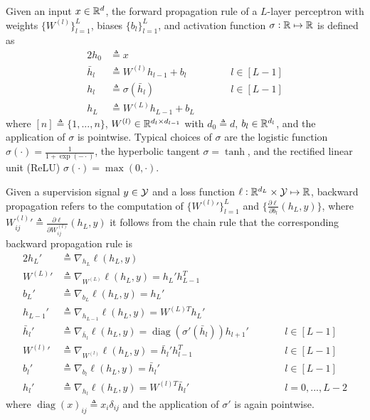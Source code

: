 \documentclass{article}
\DeclareMathOperator{\diag}{diag}
\newcommand{\pp}[2]{{\frac{\partial {#1}}{\partial {#2}}}}
\begin{document}
Given an input $x \in {\mathbb R}^d$, the forward propagation rule of a $L$-layer perceptron with weights $\{W^{(l)}\}_{l = 1}^L$, biases $\{b_l\}_{l = 1}^L$, and activation function $\sigma: {\mathbb R} \mapsto {\mathbb R}$ is defined as
\begin{alignat*}{2}
h_0 & \triangleq x \\
\bar{h}_l & \triangleq W^{(l)} h_{l - 1} + b_l && \qquad l \in [L - 1] \\
h_l & \triangleq \sigma (\bar{h}_l) && \qquad l \in [L - 1] \\
h_L & \triangleq W^{(L)} h_{L - 1} + b_L
\end{alignat*}
where $[n] \triangleq \{1, ..., n\}$, $W^{(l)} \in {\mathbb R}^{d_l \times d_{l - 1}}$ with $d_0 \triangleq d$, $b_l \in {\mathbb R}^{d_l}$, and the application of $\sigma$ is pointwise.
Typical choices of $\sigma$ are the logistic function $\sigma (\cdot) = \frac1{1 + \exp (-\cdot)}$, the hyperbolic tangent $\sigma = \tanh$, and the rectified linear unit (ReLU) $\sigma (\cdot) = \max (0, \cdot)$.

Given a supervision signal $y \in {\mathcal Y}$ and a loss function $\ell: {\mathbb R}^{d_L} \times {\mathcal Y} \mapsto {\mathbb R}$, backward propagation refers to the computation of $\{W^{(l)}'\}_{l = 1}^L$ and $\{\pp{\ell}{b_l} (h_L, y)\}$, where $W_{i j}^{(l)}' \triangleq \pp{\ell}{W_{i j}^{(l)}} (h_L, y)$
it follows from the chain rule that the corresponding backward propagation rule is
\begin{alignat*}{2}
h_L' & \triangleq \nabla_{h_L} \ell (h_L, y) \\
W^{(L)}' & \triangleq \nabla_{W^{(L)}} \ell (h_L, y) = h_L' h_{L - 1}^T \\
b_L' & \triangleq \nabla_{b_L} \ell (h_L, y) = h_L' \\
h_{L - 1}' & \triangleq \nabla_{h_{L - 1}} \ell (h_L, y) = W^{(L) T} h_L' \\
\bar{h}_l' & \triangleq \nabla_{\bar{h}_l} \ell (h_L, y) = \diag (\sigma' (\bar{h}_l)) h_{l + 1}' && \qquad l \in [L - 1] \\
W^{(l)}' & \triangleq \nabla_{W^{(l)}} \ell (h_L, y) = \bar{h}_l' h_{l - 1}^T && \qquad l \in [L - 1] \\
b_l' & \triangleq \nabla_{b_l} \ell (h_L, y) = \bar{h}_l' && \qquad l \in [L - 1] \\
h_l' & \triangleq \nabla_{h_l} \ell (h_L, y) = W^{(l) T} \bar{h}_l' && \qquad l = 0, ..., L - 2
\end{alignat*}
where $\diag (x)_{i j} \triangleq x_i \delta_{i j}$ and the application of $\sigma'$ is again pointwise.
\end{document}
